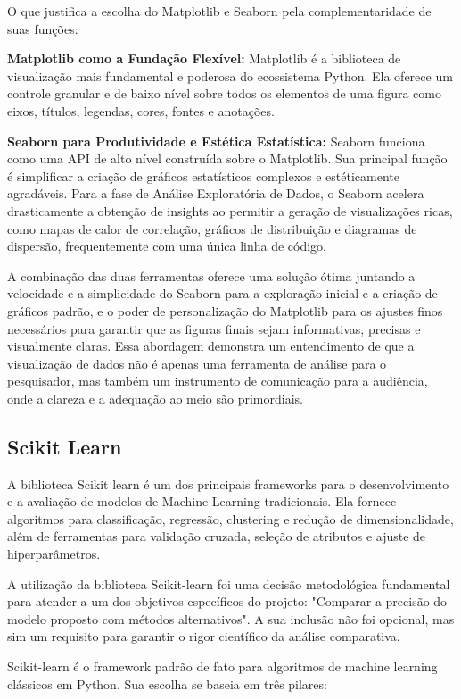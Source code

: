 O que justifica a escolha do Matplotlib e Seaborn pela complementaridade de suas funções:

\textbf{Matplotlib como a Fundação Flexível:} Matplotlib é a biblioteca de visualização mais fundamental e poderosa do ecossistema Python. Ela oferece um controle granular e de baixo nível sobre todos os elementos de uma figura como eixos, títulos, legendas, cores, fontes e anotações.

\textbf{Seaborn para Produtividade e Estética Estatística:} Seaborn funciona como uma API de alto nível construída sobre o Matplotlib. Sua principal função é simplificar a criação de gráficos estatísticos complexos e estéticamente agradáveis. Para a fase de Análise Exploratória de Dados, o Seaborn acelera drasticamente a obtenção de insights ao permitir a geração de visualizações ricas, como mapas de calor de correlação, gráficos de distribuição e diagramas de dispersão, frequentemente com uma única linha de código.

A combinação das duas ferramentas oferece uma solução ótima juntando a velocidade e a simplicidade do Seaborn para a exploração inicial e a criação de gráficos padrão, e o poder de personalização do Matplotlib para os ajustes finos necessários para garantir que as figuras finais sejam informativas, precisas e visualmente claras. Essa abordagem demonstra um entendimento de que a visualização de dados não é apenas uma ferramenta de análise para o pesquisador, mas também um instrumento de comunicação para a audiência, onde a clareza e a adequação ao meio são primordiais.

\subsection{Scikit Learn}
A biblioteca Scikit learn é um dos principais frameworks para o desenvolvimento e a avaliação de modelos de Machine Learning tradicionais. Ela fornece algoritmos para classificação, regressão, clustering e redução de dimensionalidade, além de ferramentas para validação cruzada, seleção de atributos e ajuste de hiperparâmetros\cite{Pedregosa2011}. 

A utilização da biblioteca Scikit-learn foi uma decisão metodológica fundamental para atender a um dos objetivos específicos do projeto: "Comparar a precisão do modelo proposto com métodos alternativos". A sua inclusão não foi opcional, mas sim um requisito para garantir o rigor científico da análise comparativa.

Scikit-learn é o framework padrão de fato para algoritmos de machine learning clássicos em Python. Sua escolha se baseia em três pilares:

